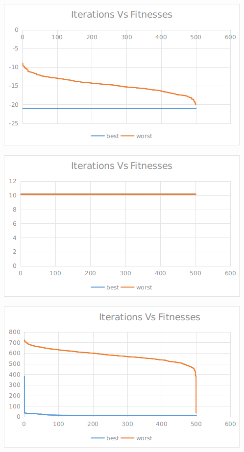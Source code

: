 \documentclass[12pt]{article}
\begin{document}
					\hfill
					\begin{minipage}{0.6\linewidth}
						\includegraphics[width=\linewidth]{42.png}
					\end{minipage}
					\begin{minipage}{0.6\linewidth}
						\includegraphics[width=\linewidth]{43.png}
					\end{minipage}
					\hfill
					\begin{minipage}{0.6\linewidth}
						\includegraphics[width=\linewidth]{44.png}
					\end{minipage}
\end{document}
